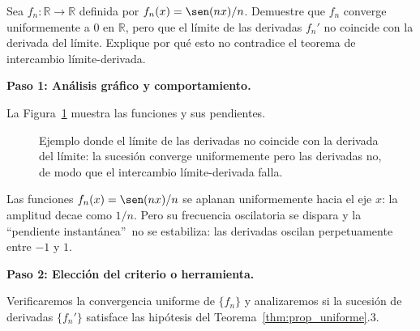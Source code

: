 \begin{example}
Sea $f_n\colon\mathbb{R}\to\mathbb{R}$ definida por $f_n(x)=\sen(nx)/n$.
Demuestre que $f_n$ converge uniformemente a $0$ en $\mathbb{R}$, pero
que el límite de las derivadas $f_n'$ no coincide con la derivada del
límite. Explique por qué esto no contradice el teorema de
intercambio límite-derivada. 
\begin{myproof}
\textbf{Paso 1: Análisis gráfico y comportamiento.}

La Figura~\ref{fig:ssf_intercambio_derivada} muestra las funciones y sus pendientes.

\begin{figure}[H]
\centering
{}
\caption{Ejemplo donde el límite de las derivadas no coincide con la derivada del límite: la sucesión converge uniformemente pero las derivadas no, de modo que el intercambio límite-derivada falla.}
\label{fig:ssf_intercambio_derivada}
\end{figure}

Las funciones $f_n(x) = \sen(nx)/n$ se aplanan uniformemente hacia el
eje $x$: la amplitud decae como $1/n$. Pero su frecuencia oscilatoria
se dispara y la \textquotedblleft pendiente instantánea\textquotedblright\
no se estabiliza: las derivadas oscilan perpetuamente entre $-1$ y $1$.

\textbf{Paso 2: Elección del criterio o herramienta.}

Verificaremos la convergencia uniforme de $\{f_n\}$ y analizaremos si
la sucesión de derivadas $\{f_n'\}$ satisface las hipótesis del
Teorema~\ref{thm:prop_uniforme}.3.


\end{myproof}
\end{example}
